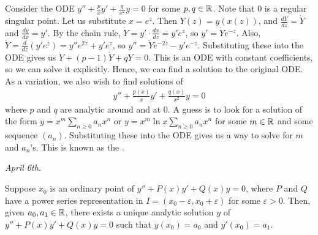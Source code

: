 Consider the ODE $y'' + \frac{p}{x} y' + \frac{q}{x^{2}} y = 0$ for some $p,q \in \mathbb{R}$. Note that $0$ is a regular singular point. Let us substitute $x = e^{z}$. Then $Y(z) = y(x(z))$, and $\frac{dY}{dz} = \dot{Y}$ and $\frac{dy}{dx} = y'$. By the chain rule, $\dot{Y} = y' \cdot \frac{dx}{dz} = y' e^{z}$, so $y' = \dot{Y} e^{-z}$. Also, $\ddot{Y} = \frac{d}{dz} (y' e^{z}) = y'' e^{2z} + y' e^{z}$, so $y'' = \ddot{Y} e^{-2z} - y' e^{-z}$. Substituting these into the ODE gives us $\ddot{Y} + (p-1) \dot{Y} + q Y = 0$. This is an ODE with constant coefficients, so we can solve it explicitly. Hence, we can find a solution to the original ODE. As a variation, we also wish to find solutions of
\begin{align}
    y'' + \frac{p(x)}{x} y' + \frac{q(x)}{x^{2}} y = 0
\end{align}
where $p$ and $q$ are analytic around and at $0$. A guess is to look for a solution of the form $y = x^{m} \sum_{n \geq 0} a_{n} x^{n}$ or $y = x^{m} \ln x \sum_{n \geq 0} a_{n} x^{n}$ for some $m \in \mathbb{R}$ and some sequence $(a_{n})$. Substituting these into the ODE gives us a way to solve for $m$ and $a_{n}$'s. This is known as the .

\textit{April 6th.}

\begin{theorem}
    Suppose $x_{0}$ is an ordinary point of $y'' + P(x) y' + Q(x) y = 0$, where $P$ and $Q$ have a power series representation in $I = (x_{0}-\varepsilon,x_{0}+\varepsilon)$ for some $\varepsilon > 0$. Then, given $a_{0},a_{1} \in \mathbb{R}$, there exists a unique analytic solution $y$ of $y'' + P(x) y' + Q(x) y = 0$ such that $y(x_{0}) = a_{0}$ and $y'(x_{0}) = a_{1}$.
\end{theorem}

